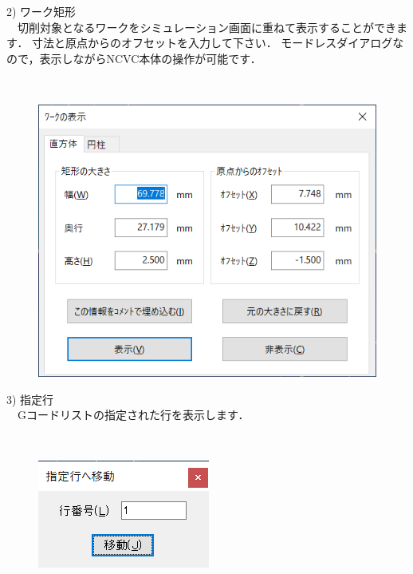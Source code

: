 \begin{minipage}[t]{0.48\textwidth}
2) ワーク矩形\\
　切削対象となるワークをシミュレーション画面に重ねて表示することができます．
寸法と原点からのオフセットを入力して下さい．
モードレスダイアログなので，表示しながらNCVC本体の操作が可能です．
\end{minipage}
\begin{minipage}[t]{0.02\textwidth}
　
\end{minipage}
\begin{minipage}[t]{0.5\textwidth}
\vspace*{-2zh}
\begin{figure}[H]
\centering
\includegraphics[width=\textwidth]{No6/fig/nc-workrect.png}
\label{fig:nc-workrect.png}
\end{figure}
\end{minipage}

\begin{minipage}[t]{0.58\textwidth}
3) 指定行\\
　Gコードリストの指定された行を表示します．
\end{minipage}
\begin{minipage}[t]{0.02\textwidth}
　
\end{minipage}
\begin{minipage}[t]{0.4\textwidth}
\vspace*{-2zh}
\begin{figure}[H]
\centering
\includegraphics{No6/fig/nc-jump.png}
\label{fig:nc-jump.png}
\end{figure}
\end{minipage}
